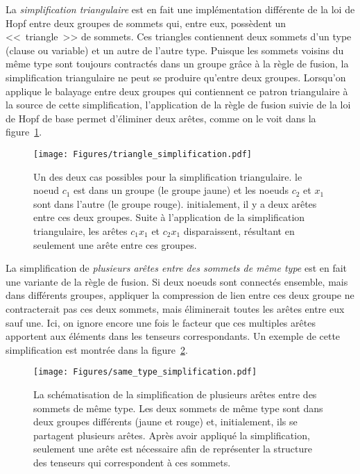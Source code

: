La \emph{simplification triangulaire} est en fait une implémentation différente de la loi de Hopf entre deux groupes de sommets qui, entre eux, possèdent un <<~triangle~>> de sommets.
Ces triangles contiennent deux sommets d'un type (clause ou variable) et un autre de l'autre type.
Puisque les sommets voisins du même type sont toujours contractés dans un groupe grâce à la règle de fusion, la simplification triangulaire ne peut se produire qu'entre deux groupes.
Lorsqu'on applique le balayage entre deux groupes qui contiennent ce patron triangulaire à la source de cette simplification, l'application de la règle de fusion suivie de la loi de Hopf de base permet d'éliminer deux arêtes, comme on le voit dans la figure~\ref{fig:triangle_rule}.
\begin{figure}[htbp]
    \centering
    \texttt{[image: Figures/triangle\_simplification.pdf]}
    \caption[Représentation graphique d'un des deux cas possibles pour la simplification triangulaire.]{Un des deux cas possibles pour la simplification triangulaire. le noeud $c_1$ est dans un groupe (le groupe jaune) et les noeuds $c_2$ et $x_1$ sont dans l'autre (le groupe rouge). initialement, il y a deux arêtes entre ces deux groupes. Suite à l'application de la simplification triangulaire, les arêtes $c_1x_1$ et $c_2x_1$ disparaissent, résultant en seulement une arête entre ces groupes.}
    \label{fig:triangle_rule}
\end{figure}

La simplification de \emph{plusieurs arêtes entre des sommets de même type} est en fait une variante de la règle de fusion.
Si deux noeuds sont connectés ensemble, mais dans différents groupes, appliquer la compression de lien entre ces deux groupe ne contracterait pas ces deux sommets, mais éliminerait toutes les arêtes entre eux sauf une.
Ici, on ignore encore une fois le facteur que ces multiples arêtes apportent aux éléments dans les tenseurs correspondants.
Un exemple de cette simplification est montrée dans la figure~\ref{fig:same_type_simplification}.
\begin{figure}[htbp]
    \centering
    \texttt{[image: Figures/same\_type\_simplification.pdf]}
    \caption[Représentation graphique de la simplification de plusieurs arêtes entre des sommets de même type.]{La schématisation de la simplification de plusieurs arêtes entre des sommets de même type. Les deux sommets de même type sont dans deux groupes différents (jaune et rouge) et, initialement, ils se partagent plusieurs arêtes. Après avoir appliqué la simplification, seulement une arête est nécessaire afin de représenter la structure des tenseurs qui correspondent à ces sommets.}
    \label{fig:same_type_simplification}
\end{figure}

